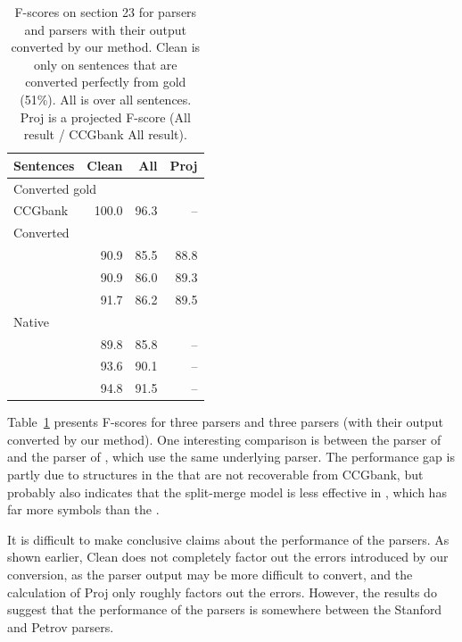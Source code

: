 \begin{table}
\centering
\begin{tabular}{lrr|r}
	\hline
	Sentences & Clean & All & Proj \\
	\hline
	\hline
		\multicolumn{2}{l}{Converted gold \ccg} & & \\
		CCGbank & \hspace{0mm}100.0 & \hspace{0mm}96.3 & -- \\
	\hline
		\multicolumn{2}{l}{Converted \ccg} & & \\
		\textcite{Clark-Curran:2007} & 90.9 & 85.5 & 88.8 \\
		\textcite{Fowler-Penn:2010} & 90.9 & 86.0 & 89.3 \\
		\textcite{Auli-Lopez:2011} & 91.7 & 86.2 & 89.5 \\
	\hline
		\multicolumn{2}{l}{Native \ptb} & & \\
		\textcite{Klein-Manning:2003:ACL} & 89.8 & 85.8 & -- \\
		\textcite{Petrov-Klein:2007} & 93.6 & 90.1 & -- \\
		\textcite{Charniak-Johnson:2005} & 94.8 & 91.5 & -- \\
	\hline
\end{tabular}
\caption[F-scores on section 23 for \ptb parsers and \ccg parsers with their output converted by our method.]{ \label{tab:full-comp}
	F-scores on section 23 for \ptb parsers and \ccg parsers with their output converted by our method.
	Clean is only on sentences that are converted perfectly from gold \ccg (51\%).
	All is over all sentences.
	Proj is a projected F-score (All result / CCGbank All result).
}
\end{table}

Table~\ref{tab:full-comp} presents F-scores for three \ptb parsers and three
\ccg parsers (with their output converted by our method).  One interesting
comparison is between the \ptb parser of \textcite{Petrov-Klein:2007} and the
\ccg parser of \textcite{Fowler-Penn:2010}, which use the same underlying
parser.  The performance gap is partly due to structures in the \ptb that are
not recoverable from CCGbank, but probably also indicates that the split-merge
model is less effective in \ccg, which has far more symbols than the \ptb.

It is difficult to make conclusive claims about the performance of the parsers.
As shown earlier, Clean does not completely factor out the errors
introduced by our conversion, as the parser output may be more difficult to
convert, and the calculation of Proj only roughly factors out the
errors.  However, the results do suggest that the performance of the \ccg
parsers is somewhere between the Stanford and Petrov parsers.

